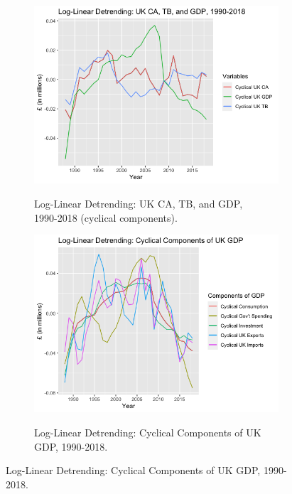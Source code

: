 \documentclass[12pt]{article}
\begin{document}
\begin{figure}[h!]
\centering
\begin{subfigure}{.5\textwidth}
  \centering
\includegraphics[scale=0.45]{6.png}
\label{}
\caption{Log-Linear Detrending: UK CA, TB, and GDP, \\ 1990-2018 (cyclical components).}
\end{subfigure}%
\begin{subfigure}{.5\textwidth}
\centering
\includegraphics[scale=0.45]{7.png}
\label{}
\caption{Log-Linear Detrending: Cyclical Components of UK GDP, 1990-2018.}
\end{subfigure}
\end{figure}
\end{document}
